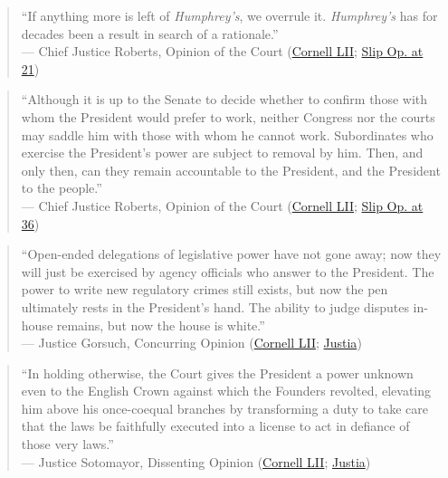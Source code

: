 \documentclass[12pt]{article}
\begin{document}
\begin{quote}
``If anything more is left of \textit{Humphrey's}, we overrule it. \textit{Humphrey's} has for decades been a result in search of a rationale.'' \\
--- Chief Justice Roberts, Opinion of the Court (\href{https://www.law.cornell.edu/supremecourt/text/25-332}{Cornell LII}; \href{https://www.supremecourt.gov/opinions/25pdf/25-322_new_4gcj.pdf}{Slip Op. at 21})
\end{quote}

\begin{quote}
``Although it is up to the Senate to decide whether to confirm those with whom the President would prefer to work, neither Congress nor the courts may saddle him with those with whom he cannot work. Subordinates who exercise the President's power are subject to removal by him. Then, and only then, can they remain accountable to the President, and the President to the people.'' \\
--- Chief Justice Roberts, Opinion of the Court (\href{https://www.law.cornell.edu/supremecourt/text/25-332}{Cornell LII}; \href{https://www.supremecourt.gov/opinions/25pdf/25-322_new_4gcj.pdf}{Slip Op. at 36})
\end{quote}

\begin{quote}
``Open-ended delegations of legislative power have not gone away; now they will just be exercised by agency officials who answer to the President. The power to write new regulatory crimes still exists, but now the pen ultimately rests in the President's hand. The ability to judge disputes in-house remains, but now the house is white.'' \\
--- Justice Gorsuch, Concurring Opinion (\href{https://www.law.cornell.edu/supremecourt/text/25-332}{Cornell LII}; \href{https://supreme.justia.com/cases/federal/us/609/25-332/}{Justia})
\end{quote}

\begin{quote}
``In holding otherwise, the Court gives the President a power unknown even to the English Crown against which the Founders revolted, elevating him above his once-coequal branches by transforming a duty to take care that the laws be faithfully executed into a license to act in defiance of those very laws.'' \\
--- Justice Sotomayor, Dissenting Opinion (\href{https://www.law.cornell.edu/supremecourt/text/25-332}{Cornell LII}; \href{https://supreme.justia.com/cases/federal/us/609/25-332/}{Justia})
\end{quote}
\end{document}
